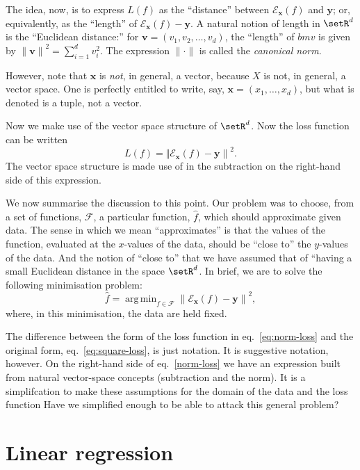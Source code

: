 \documentclass[10pt, a4paper]{article}
\DeclareMathOperator*{\argmin}{arg\,min}
\begin{document}
The idea, now, is to express $L(f)$ as the “distance” between
$\mathcal{E}_{\bm{x}}(f)$ and $\bm{y}$; or, equivalently, as the “length” of
$\mathcal{E}_{\bm{x}}(f)-\bm{y}$. A natural notion of length in
$\setR^d$ is the “Euclidean distance:” for
$\bm{v}=(v_1, v_2, \dotsc, v_d)$, the “length” of $bm{v}$ is given by
${\lVert \bm{v} \rVert}^2 = \sum_{i=1}^d v_i^2$. The expression
$\lVert\cdot\rVert$ is called the \emph{canonical norm}.

However, note that $\bm{x}$ is \emph{not}, in general, a vector,
because $X$ is not, in general, a vector space. One is perfectly
entitled to write, say, $\bm{x}=(x_1, \dotsc, x_d)$, but what is
denoted is a tuple, not a vector.

Now we make use of the vector space structure of $\setR^d$.  Now the loss function
can be written
\begin{equation}
  \label{eq:norm-loss}
  L(f) = {\Vert \mathcal{E}_{\bm{x}}(f) - \bm{y}\rVert }^2.
\end{equation}
The vector space structure is made use of in the subtraction on the
right-hand side of this expression.

We now summarise the discussion to this point. Our problem was to
choose, from a set of functions, $\mathcal{F}$, a particular function,
$\hat{f}$, which should approximate given data. The sense in which we
mean “approximates” is that the values of the function, evaluated at
the $x$-values of the data, should be “close to” the $y$-values of the
data. And the notion of “close to” that we have assumed that of
“having a small Euclidean distance in the space $\setR^d$. In brief,
we are to solve the following minimisation problem:
\begin{equation}
  \label{eq:least-squares}
  \hat{f} = \argmin_{f\in\mathcal{F}} {\lVert \mathcal{E}_{\bm{x}}(f) - \bm{y}\rVert}^2,
\end{equation}
where, in this minimisation, the data are held fixed.

The difference between the form of the loss function in
eq.~\eqref{eq:norm-loss} and the original form,
eq.~\eqref{eq:square-loss}, is just notation. It is suggestive
notation, however. On the right-hand side of eq.~\eqref{norm-loss} we
have an expression built from natural vector-space concepts
(subtraction and the norm). It is a simplifcation to make
these assumptions for the domain of the data and the loss
function Have we
simplified enough to be able to attack this general problem?

\section{Linear regression}
\end{document}
